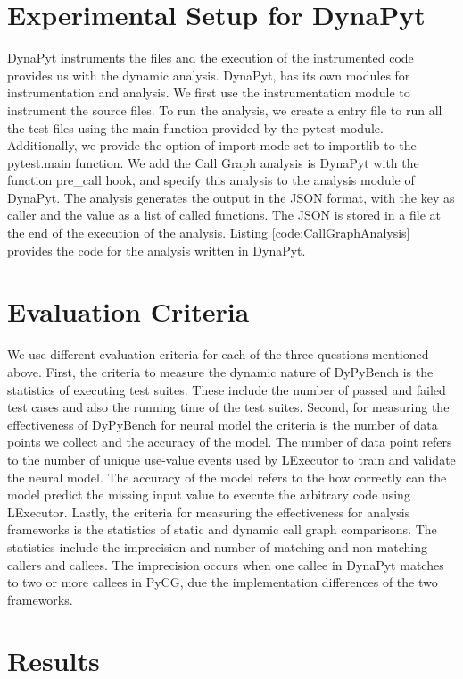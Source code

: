 \section{Experimental Setup for DynaPyt}
DynaPyt instruments the files and the execution of the instrumented code provides us with the dynamic analysis.
DynaPyt, has its own modules for instrumentation and analysis.
We first use the instrumentation module to instrument the source files.
To run the analysis, we create a entry file to run all the test files using the main function provided by the pytest module.
Additionally, we provide the option of import-mode set to importlib to the pytest.main function.
We add the Call Graph analysis is DynaPyt with the function pre\_call hook, and specify this analysis to the analysis module of DynaPyt.
The analysis generates the output in the JSON format, with the key as caller and the value as a list of called functions.
The JSON is stored in a file at the end of the execution of the analysis.
Listing \ref{code:CallGraphAnalysis} provides the code for the analysis written in DynaPyt.

\section{Evaluation Criteria}
We use different evaluation criteria for each of the three questions mentioned above.
First, the criteria to measure the dynamic nature of DyPyBench is the statistics of executing test suites.
These include the number of passed and failed test cases and also the running time of the test suites.
Second, for measuring the effectiveness of DyPyBench for neural model the criteria is the number of data points we collect and the accuracy of the model.
The number of data point refers to the number of unique use-value events used by LExecutor to train and validate the neural model.
The accuracy of the model refers to the how correctly can the model predict the missing input value to execute the arbitrary code using LExecutor. 
Lastly, the criteria for measuring the effectiveness for analysis frameworks is the statistics of static and dynamic call graph comparisons.
The statistics include the imprecision and number of matching and non-matching callers and callees.
The imprecision occurs when one callee in DynaPyt matches to two or more callees in PyCG, due the implementation differences of the two frameworks.

\section{Results}

